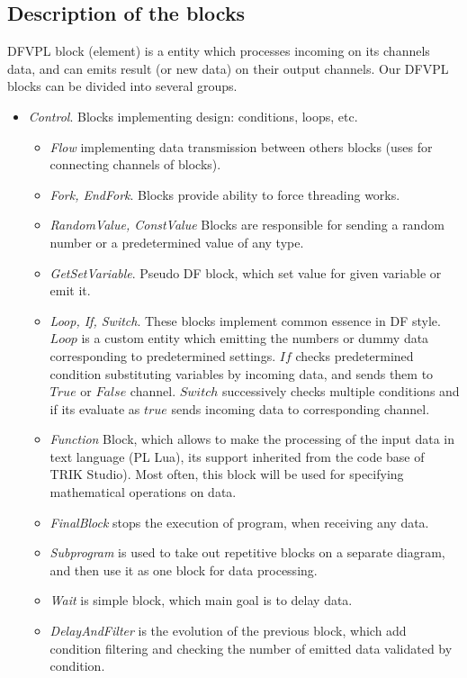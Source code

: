 \documentclass[conference,compsoc]{IEEEtran}
\begin{document}
\subsection{Description of the blocks}
DFVPL block (element) is a entity which processes incoming on its channels data, and can emits result (or new data) on their output channels. Our DFVPL blocks can be divided into several groups.

\begin{itemize}
\item \textit{Control}. Blocks implementing design: conditions, loops, etc.
\begin{itemize}
\item \textit{Flow} implementing data transmission between others blocks (uses for connecting channels of blocks).
\item \textit{Fork, EndFork}. Blocks provide ability to force threading works.
\item \textit{RandomValue, ConstValue} Blocks are responsible for sending a random number or a predetermined value of any type.
\item \textit{GetSetVariable}. Pseudo DF block, which set value for given variable or emit it.
\item \textit{Loop, If, Switch}. These blocks implement common essence in DF style. $Loop$ is a custom entity which emitting the numbers or dummy data corresponding to predetermined settings. $If$ checks predetermined condition substituting variables by incoming data, and sends them to $True$ or $False$ channel. $Switch$ successively checks multiple conditions and if its evaluate as $true$ sends incoming data to corresponding channel.  	
\item \textit{Function} Block, which allows to make the processing of the input data in text language (PL Lua\cite{lua}), its support inherited from the code base of TRIK Studio). Most often, this block will be used for specifying mathematical operations on data.
\item \textit{FinalBlock} stops the execution of program, when receiving any data. 
\item \textit{Subprogram} is used to take out repetitive blocks on a separate diagram, and then use it as one block for data processing.
\item \textit{Wait} is simple block, which main goal is to delay data.
\item \textit{DelayAndFilter} is the evolution of the previous block, which add condition filtering and checking the number of emitted data validated by condition.

\end{itemize}
\end{itemize}
\end{document}
